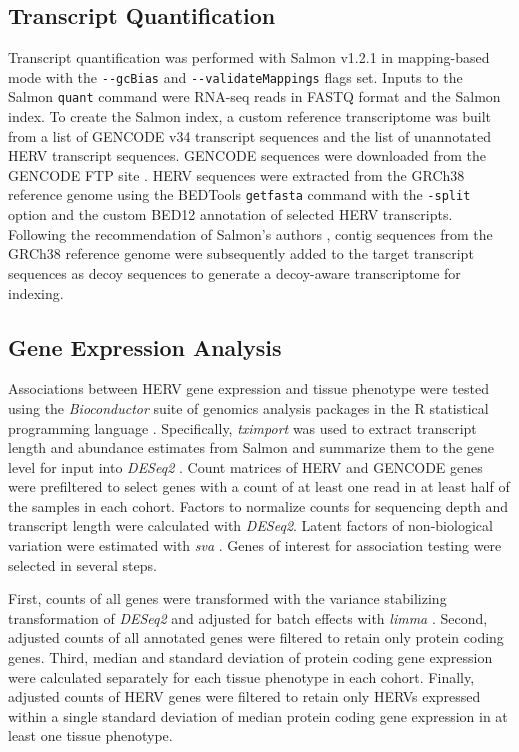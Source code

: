 \documentclass[10pt,letterpaper]{article}
\begin{document}
\subsection*{Transcript Quantification}
Transcript quantification was performed with Salmon v1.2.1 \cite{Patro2017} in mapping-based mode with the \verb|--gcBias| and \verb|--validateMappings| flags set.
Inputs to the Salmon \verb|quant| command were RNA-seq reads in FASTQ format and the Salmon index.
To create the Salmon index, a custom reference transcriptome was built from a list of GENCODE v34  transcript sequences \cite{Frankish2018} and the list of unannotated HERV transcript sequences.
GENCODE sequences were downloaded from the GENCODE FTP site \cite{GENCODE-transcripts}.
HERV sequences were extracted from the GRCh38 reference genome \cite{ENCODE-GRCh38} using the BEDTools \cite{Quinlan2010} \verb|getfasta| command with the \verb|-split| option and the custom BED12 annotation of selected HERV transcripts.
Following the recommendation of Salmon's authors \cite{SalmonDecoys}, contig sequences from the GRCh38 reference genome were subsequently added to the target transcript sequences as decoy sequences to generate a decoy-aware transcriptome for indexing.

\subsection*{Gene Expression Analysis}
Associations between HERV gene expression and tissue phenotype were tested using the \emph{Bioconductor} suite of genomics analysis packages \cite{bioc} in the R statistical programming language \cite{R}.
Specifically, \emph{tximport} \cite{Soneson2015} was used to extract transcript length and abundance estimates from Salmon and summarize them to the gene level for input into \emph{DESeq2} \cite{Love2014}.
Count matrices of HERV and GENCODE genes were prefiltered to select genes with a count of at least one read in at least half of the samples in each cohort.
Factors to normalize counts for sequencing depth and transcript length were calculated with \emph{DESeq2}.
Latent factors of non-biological variation were estimated with \emph{sva} \cite{sva}.
Genes of interest for association testing were selected in several steps.

First, counts of all genes were transformed with the variance stabilizing transformation of \emph{DESeq2} and adjusted for batch effects with \emph{limma} \cite{Ritchie2015}.
Second, adjusted counts of all annotated genes were filtered to retain only protein coding genes.
Third, median and standard deviation of protein coding gene expression were calculated separately for each tissue phenotype in each cohort.
Finally, adjusted counts of HERV genes were filtered to retain only HERVs expressed within a single standard deviation of median protein coding gene expression in at least one tissue phenotype.
\end{document}
